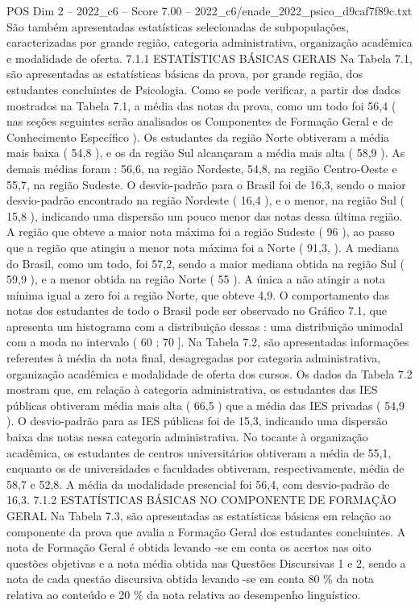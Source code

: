 \begin{textsample}{POS Dim 2 – 2022\_c6 – Score 7.00 – 2022\_c6/enade\_2022\_psico\_d9caf7f89c.txt}
São também apresentadas estatísticas selecionadas de subpopulações, caracterizadas por grande região, categoria administrativa, organização acadêmica e modalidade de oferta. 7.1.1 ESTATÍSTICAS BÁSICAS GERAIS Na Tabela 7.1, são apresentadas as estatísticas básicas da prova, por grande região, dos estudantes concluintes de Psicologia.
Como se pode verificar, a partir dos dados mostrados na Tabela 7.1, a média das notas da prova, como um todo foi 56,4 ( nas seções seguintes serão analisados os Componentes de Formação Geral e de Conhecimento Específico ).
Os estudantes da região Norte obtiveram a média mais baixa ( 54,8 ), e os da região Sul alcançaram a média mais alta ( 58,9 ).
As demais médias foram : 56,6, na região Nordeste, 54,8, na região Centro-Oeste e 55,7, na região Sudeste.
O desvio-padrão para o Brasil foi de 16,3, sendo o maior desvio-padrão encontrado na região Nordeste ( 16,4 ), e o menor, na região Sul ( 15,8 ), indicando uma dispersão um pouco menor das notas dessa última região.
A região que obteve a maior nota máxima foi a região Sudeste ( 96 ), ao passo que a região que atingiu a menor nota máxima foi a Norte ( 91,3, ).
A mediana do Brasil, como um todo, foi 57,2, sendo a maior mediana obtida na região Sul ( 59,9 ), e a menor obtida na região Norte ( 55 ).
A única a não atingir a nota mínima igual a zero foi a região Norte, que obteve 4,9.
O comportamento das notas dos estudantes de todo o Brasil pode ser observado no Gráfico 7.1, que apresenta um histograma com a distribuição dessas : uma distribuição unimodal com a moda no intervalo ( 60 ; 70 ].
Na Tabela 7.2, são apresentadas informações referentes à média da nota final, desagregadas por categoria administrativa, organização acadêmica e modalidade de oferta dos cursos.
Os dados da Tabela 7.2 mostram que, em relação à categoria administrativa, os estudantes das IES públicas obtiveram média mais alta ( 66,5 ) que a média das IES privadas ( 54,9 ).
O desvio-padrão para as IES públicas foi de 15,3, indicando uma dispersão baixa das notas nessa categoria administrativa.
No tocante à organização acadêmica, os estudantes de centros universitários obtiveram a média de 55,1, enquanto os de universidades e faculdades obtiveram, respectivamente, média de 58,7 e 52,8.
A média da modalidade presencial foi 56,4, com desvio-padrão de 16,3. 7.1.2 ESTATÍSTICAS BÁSICAS NO COMPONENTE DE FORMAÇÃO GERAL Na Tabela 7.3, são apresentadas as estatísticas básicas em relação ao componente da prova que avalia a Formação Geral dos estudantes concluintes.
A nota de Formação Geral é obtida levando -se em conta os acertos nas oito questões objetivas e a nota média obtida nas Questões Discursivas 1 e 2, sendo a nota de cada questão discursiva obtida levando -se em conta 80 \% da nota relativa ao conteúdo e 20 \% da nota relativa ao desempenho linguístico.

\end{textsample}
